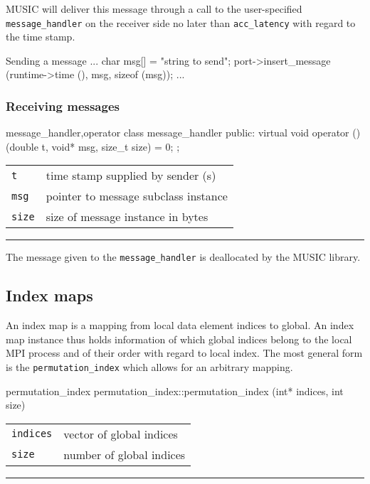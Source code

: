 \documentclass[a4paper]{report}
\makeatletter
\newenvironment{parameters}%
{\begin{tabular}{@{\hspace{2em}}lp{0.6\textwidth}}}%
{\end{tabular}\par\vspace{1mm}\par\hrule\par\vspace{5mm}}
\makeatother
\begin{document}
MUSIC will deliver this message through a call to the user-specified
\lstinline|message_handler| on the receiver side no later than
\lstinline|acc_latency| with regard to the time stamp.

\begin{code}{Sending a message}
{
  ...
  char msg[] = "string to send";
  port->insert_message (runtime->time (), msg, sizeof (msg));
  ...
}
\end{code}


\subsubsection{Receiving messages}

\begin{head}{message_handler,operator}
  class message_handler {
  public:
    virtual void operator () (double t, void* msg, size_t size) = 0;
  };
\end{head}
\begin{parameters}
  \lstinline|t| & time stamp supplied by sender (s) \\
  \lstinline|msg| & pointer to message subclass instance \\
  \lstinline|size| & size of message instance in bytes \\
\end{parameters}

The message given to the \lstinline|message_handler| is deallocated by
the MUSIC library.


\subsection{Index maps}

An index map is a mapping from local data element indices to
global. An index map instance thus holds information of which global
indices belong to the local MPI process and of their order with regard
to local index.  The most general form is the
\lstinline|permutation_index| which allows for an arbitrary mapping.

\begin{head}{permutation_index}
  permutation_index::permutation_index (int* indices,
                                        int size)
\end{head}
\begin{parameters}
  \lstinline|indices| & vector of global indices \\
  \lstinline|size| & number of global indices \\
\end{parameters}
\end{document}
